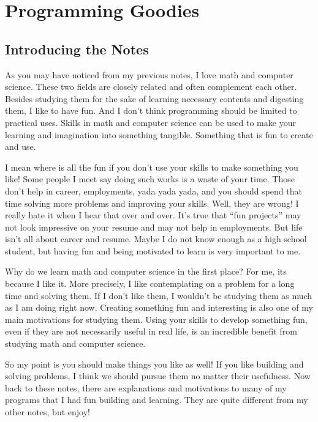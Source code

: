 \documentclass[../../main.tex]{subfiles}
\begin{document}
\part{Programming Goodies}\label{part:CS03}
\localtableofcontents

\chapter*{Introducing the Notes}

As you may have noticed from my previous notes, I love math and
computer science. These two fields are closely related and often
complement each other. Besides studying them for the sake of
learning necessary contents and digesting them, I like to have fun.
And I don't think programming should be limited to practical uses.
Skills in math and computer science can be used to make your learning
and imagination into something tangible. Something that is fun to
create and use.

I mean where is all the fun if you don't use your skills to make
something you like! Some people I meet say doing such works is a
waste of your time. Those don't help in career, employments,
yada yada yada, and you should spend that time solving more problems
and improving your skills. Well, they are wrong! I really hate it
when I hear that over and over. It's true that ``fun projects'' may
not look impressive on your resume and may not help in employments.
But life isn't all about career and resume. Maybe I do not know
enough as a high school student, but having fun and being motivated
to learn is very important to me.

Why do we learn math and computer science in the first place?
For me, its because I like it. More precisely, I like contemplating on
a problem for a long time and solving them. If I don't like them,
I wouldn't be studying them as much as I am doing right now.
Creating something fun and interesting is also one of my main
motivations for studying them. Using your skills to develop something
fun, even if they are not necessarily useful in real life, is an
incredible benefit from studying math and computer science.

So my point is you should make things you like as well! If you like
building and solving problems, I think we should pursue them no matter
their usefulness. Now back to these notes, there are explanations and
motivations to many of my programs that I had fun building and
learning. They are quite different from my other notes, but enjoy!




\end{document}
